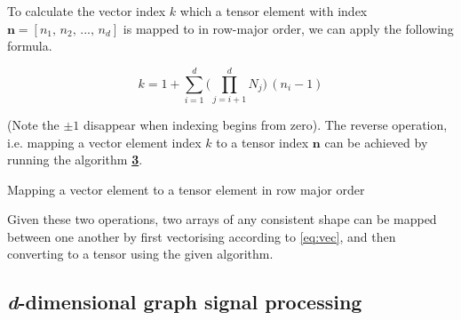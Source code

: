 To calculate the vector index $k$ which a tensor element with index $\mathbf{n} = [n_1,\, n_2,\, ...,\, n_d]$ is mapped to in row-major order, we can apply the following formula.  

\begin{equation}
    \label{eq:vec}
    k = 1 + \sum_{i=1}^d \Big( \prod_{j=i+1}^d N_j \Big) \, (n_i - 1)
\end{equation}

(Note the $\pm1$ disappear when indexing begins from zero). The reverse operation, i.e. mapping a vector element index $k$ to a tensor index $\mathbf{n}$ can be achieved by running the algorithm \hyperlink{vectoten}{\textbf{3}}. 


\begin{algorithm}[t]
    \hypertarget{vectoten}{}
    \label{al:vectoten}
    \caption{Mapping a vector element to a tensor element in row major order}
    \begin{algorithmic}
    \vspace{0.15cm}
    \vspace{0.1cm}
    \vspace{0.25cm}
    \vspace{0.25cm}
    \vspace{0.25cm}
    \vspace{0.15cm}
    \vspace{0.15cm}
    \EndFor
    \vspace{0.25cm}
    \end{algorithmic}
    \end{algorithm}



Given these two operations, two arrays of any consistent shape can be mapped between one another by first vectorising according to \cref{eq:vec}, and then converting to a tensor using the given algorithm.



\subsection{\textit{d}-dimensional graph signal processing}



